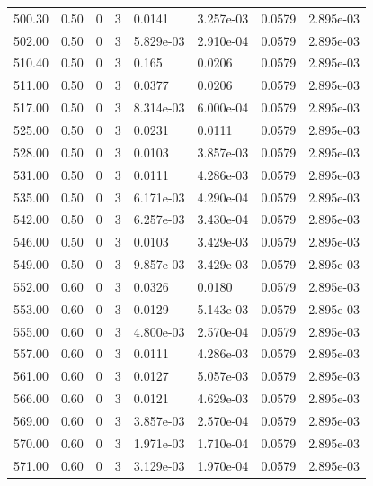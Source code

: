 \documentclass[preview]{standalone}
\begin{document}
{{{{{\begin{tabular}{L{1.2cm}C{1.2cm} C{0.3cm}C{0.5cm} C{1.4cm}C{1.4cm} C{1.4cm}C{1.4cm}}
  500.30  &  0.50  & 0     &  3 &  0.0141  & 3.257e-03  & 0.0579 &  2.895e-03   \\ 
  502.00  &  0.50  & 0     &  3 &  5.829e-03  & 2.910e-04  & 0.0579 &  2.895e-03   \\ 
  510.40  &  0.50  & 0     &  3 &  0.165  & 0.0206  & 0.0579 &  2.895e-03   \\ 
  511.00  &  0.50  & 0     &  3 &  0.0377  & 0.0206  & 0.0579 &  2.895e-03   \\ 
  517.00  &  0.50  & 0     &  3 &  8.314e-03  & 6.000e-04  & 0.0579 &  2.895e-03   \\ 
  525.00  &  0.50  & 0     &  3 &  0.0231  & 0.0111  & 0.0579 &  2.895e-03   \\ 
  528.00  &  0.50  & 0     &  3 &  0.0103  & 3.857e-03  & 0.0579 &  2.895e-03   \\ 
  531.00  &  0.50  & 0     &  3 &  0.0111  & 4.286e-03  & 0.0579 &  2.895e-03   \\ 
  535.00  &  0.50  & 0     &  3 &  6.171e-03  & 4.290e-04  & 0.0579 &  2.895e-03   \\ 
  542.00  &  0.50  & 0     &  3 &  6.257e-03  & 3.430e-04  & 0.0579 &  2.895e-03   \\ 
  546.00  &  0.50  & 0     &  3 &  0.0103  & 3.429e-03  & 0.0579 &  2.895e-03   \\ 
  549.00  &  0.50  & 0     &  3 &  9.857e-03  & 3.429e-03  & 0.0579 &  2.895e-03   \\ 
  552.00  &  0.60  & 0     &  3 &  0.0326  & 0.0180  & 0.0579 &  2.895e-03   \\ 
  553.00  &  0.60  & 0     &  3 &  0.0129  & 5.143e-03  & 0.0579 &  2.895e-03   \\ 
  555.00  &  0.60  & 0     &  3 &  4.800e-03  & 2.570e-04  & 0.0579 &  2.895e-03   \\ 
  557.00  &  0.60  & 0     &  3 &  0.0111  & 4.286e-03  & 0.0579 &  2.895e-03   \\ 
  561.00  &  0.60  & 0     &  3 &  0.0127  & 5.057e-03  & 0.0579 &  2.895e-03   \\ 
  566.00  &  0.60  & 0     &  3 &  0.0121  & 4.629e-03  & 0.0579 &  2.895e-03   \\ 
  569.00  &  0.60  & 0     &  3 &  3.857e-03  & 2.570e-04  & 0.0579 &  2.895e-03   \\ 
  570.00  &  0.60  & 0     &  3 &  1.971e-03  & 1.710e-04  & 0.0579 &  2.895e-03   \\ 
  571.00  &  0.60  & 0     &  3 &  3.129e-03  & 1.970e-04  & 0.0579 &  2.895e-03   \\ 

\end{tabular}}}}}}
\end{document}
